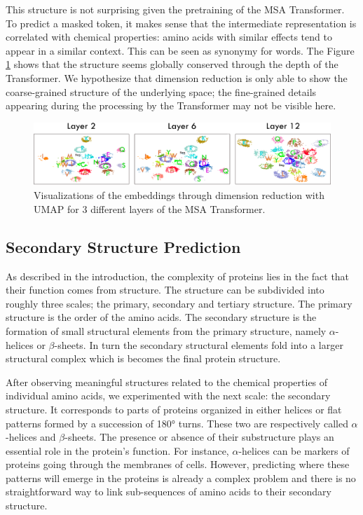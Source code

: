 \documentclass[11pt,a4paper]{article}
\begin{document}
This structure is not surprising given the pretraining of the MSA Transformer. To predict a masked token, it makes sense that the intermediate representation is correlated with chemical properties: amino acids with similar effects tend to appear in a similar context. This can be seen as synonymy for words. 
The Figure \ref{three_layers_umap} shows that the structure seems globally conserved through the depth of the Transformer. We hypothesize that dimension reduction is only able to show the coarse-grained structure of the underlying space; the fine-grained details appearing during the processing by the Transformer may not be visible here.

\begin{figure}[ht]
\centering
\includegraphics[width=\textwidth]{images/all_three_layers_strcut.png}
\caption{Visualizations of the embeddings through dimension reduction with UMAP for 3 different layers of the MSA Transformer. }
\label{three_layers_umap}
\end{figure}

\subsection{Secondary Structure Prediction} \label{sec_struct_section}

As described in the introduction, the complexity of proteins lies in the fact that their function comes from structure. The structure can be subdivided into roughly three scales; the primary, secondary and tertiary structure. The primary structure is the order of the amino acids. The secondary structure is the formation of small structural elements from the primary structure, namely $\alpha$-helices or $\beta$-sheets. In turn the secondary structural elements fold into a larger structural complex which is becomes the final protein structure.

After observing meaningful structures related to the chemical properties of individual amino acids, we experimented with the next scale: the secondary structure. It corresponds to parts of proteins organized in either helices or flat patterns formed by a succession of 180° turns. These two are respectively called $\alpha$-helices and $\beta$-sheets. The presence or absence of their substructure plays an essential role in the protein's function. For instance, $\alpha$-helices can be markers of proteins going through the membranes of cells.
However, predicting where these patterns will emerge in the proteins is already a complex problem and there is no straightforward
way to link sub-sequences of amino acids to their secondary structure. 
\end{document}
